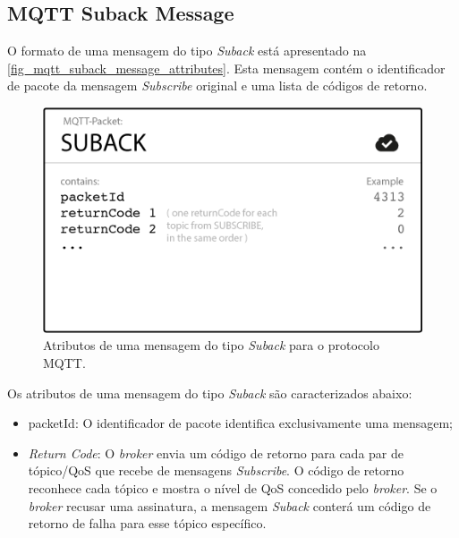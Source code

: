 \documentclass[
    12pt,
    openright,
    twoside,
    a4paper,
    english,
    spanish,
    brazil,
    ]{abntex2}
\begin{document}
\subsection{MQTT Suback Message}\label{section_mqtt_suback_message}
O formato de uma mensagem do tipo \textit{Suback} está apresentado na \autoref{fig_mqtt_suback_message_attributes}. Esta mensagem contém o identificador de pacote da mensagem \textit{Subscribe} original e uma lista de códigos de retorno.
\begin{figure}[htb]
	\begin{center}
		\caption{Atributos de uma mensagem do tipo \textit{Suback} para o protocolo MQTT.}\label{fig_mqtt_suback_message_attributes}
		\includegraphics[scale=0.5]{Images/mqtt_suback_message_attributes.png}
	\end{center}
\end{figure}

Os atributos de uma mensagem do tipo \textit{Suback} são caracterizados abaixo:
\begin{itemize}
	\item packetId: O identificador de pacote identifica exclusivamente uma mensagem;
	\item \textit{Return Code}: O \textit{broker} envia um código de retorno para cada par de tópico/QoS que recebe de mensagens \textit{Subscribe}. O código de retorno reconhece cada tópico e mostra o nível de QoS concedido pelo \textit{broker}. Se o \textit{broker} recusar uma assinatura, a mensagem \textit{Suback} conterá um código de retorno de falha para esse tópico específico.
\end{itemize}

\end{document}
